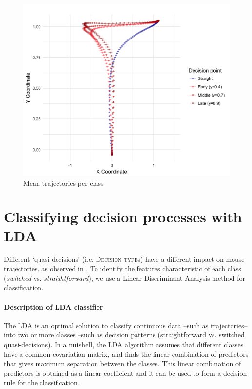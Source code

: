 \documentclass{article}
\begin{document}
\begin{figure}
\centering
\includegraphics[width=\textwidth]{calibration_mean_trajectory_pointchang.png}
\caption{Mean trajectories per class}\label{fig:mean.trajectories.calibration}
\end{figure}

\section{Classifying decision processes with LDA}
\label{sec:LDA}
Different `quasi-decisions' (i.e. \textsc{Decision type}s) have a different impact on mouse trajectories, as observed in . To identify the features characteristic of each class (\textit{switched} vs. \textit{straightforward}), we use a Linear Discriminant Analysis method for classification. 

\paragraph{Description of LDA classifier}
The LDA is an optimal solution to classify continuous data --such as trajectories-- into two or more classes --such as decision patterns (straightforward vs. switched quasi-decisions). In a nutshell, the LDA algorithm assumes that different classes have a common covariation matrix, and finds the linear combination of predictors that gives maximum separation between the classes. This linear combination of predictors is obtained as a linear coefficient and it can be used to form a decision rule for the classification. 
 
\end{document}
